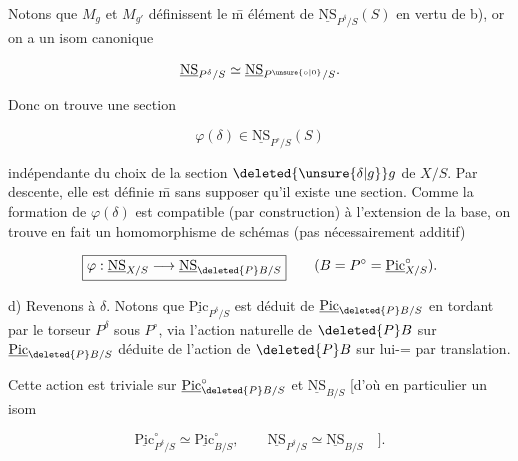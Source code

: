 
Notons que $M_g$ et $M_{g'}$ définissent le \={m} élément de $\underline{\mathrm{NS}}_{P^\delta/S}(S)$ en vertu de b), or on a un isom canonique

\[
\underline{\mathrm{NS}}_{P^\delta/S}\simeq\underline{\mathrm{NS}}_{P^{\unsure{\circ|0}}/S}.
\]

Donc on trouve une section

\[
\varphi(\delta)\in\underline{\mathrm{NS}}_{P^\circ/S}(S)
\]

indépendante du choix de la section $\deleted{\unsure{\delta|g}}g$ de $X/S$. Par descente, elle est définie \={m} sans supposer qu'il existe une section. Comme la formation de $\varphi(\delta)$ est compatible (par construction) à l'extension de la base, on trouve en fait un homomorphisme de schémas (pas nécessairement additif)


\[
\boxed{\varphi:\underline{\mathrm{NS}}_{X/S}\longrightarrow\underline{\mathrm{NS}}_{\deleted{P}B/S}}\qquad(B=P^\circ=\underline{\mathrm{Pic}}^\circ_{X/S}).
\]

d) Revenons à $\delta$. Notons que $\underline{\mathrm{Pic}}_{P^\delta/S}$ est déduit de $\underline{\mathrm{Pic}}_{\deleted{P}B/S}$ en tordant par  le torseur $P^\delta$ sous $P^\circ$, via l'action naturelle de $\deleted{P}B$ sur $\underline{\mathrm{Pic}}_{\deleted{P}B/S}$ déduite de l'action de $\deleted{P}B$ sur lui-= par translation. 

Cette action est triviale sur $\underline{\mathrm{Pic}}^\circ_{\deleted{P}B/S}$ et $\underline{\mathrm{NS}}_{B/S}$ [d'où en particulier un isom

\[
\underline{\mathrm{Pic}}^\circ_{P^\delta/S}\simeq\underline{\mathrm{Pic}}^\circ_{B/S},\qquad
\underline{\mathrm{NS}}_{P^\delta/S}\simeq\underline{\mathrm{NS}}_{B/S}\quad].
\]
